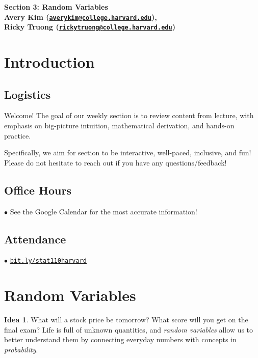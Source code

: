 \documentclass[12pt,oneside]{article}
\theoremstyle{definition}
\newtheorem*{idea}{Idea}
\theoremstyle{remark}
\begin{document}
\pagestyle{fancy}
\begin{center}
\bf \Large
Section 3: Random Variables \\[0.5em]
\normalsize
Avery Kim (\href{mailto:averykim@college.harvard.edu}{\texttt{averykim@college.harvard.edu}}), \\[0.2em]
Ricky Truong (\href{mailto:rickytruong@college.harvard.edu}{\texttt{rickytruong@college.harvard.edu}})
\end{center}

\section{Introduction}

\subsection{Logistics}

Welcome! The goal of our weekly section is to review content from lecture, with emphasis on big-picture intuition, mathematical derivation, and hands-on practice.

Specifically, we aim for section to be interactive, well-paced, inclusive, and fun! Please do not hesitate to reach out if you have any questions/feedback!

\subsection{Office Hours}

$\bullet$ See the Google Calendar for the most accurate information!

\subsection{Attendance}

$\bullet$ \href{https://bit.ly/stat110harvard}{\texttt{bit.ly/stat110harvard}}

\section{Random Variables}

\begin{idea}
What will a stock price be tomorrow? What score will you get on the final exam? Life is full of unknown quantities, and \textit{random variables} allow us to better understand them by connecting everyday numbers with concepts in \textit{probability}.
\end{idea}
\end{document}
